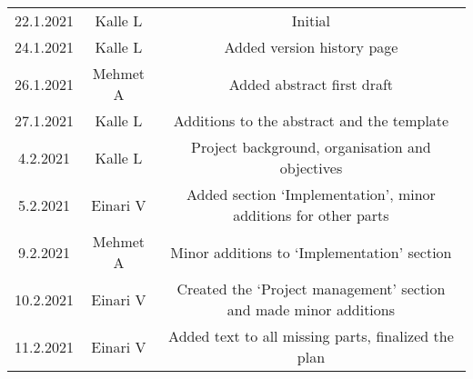 \begin{center}
	\begin{tabular}{ c c c }
		22.1.2021 & Kalle L & Initial \\ 
		24.1.2021 & Kalle L & Added version history page \\
		26.1.2021 & Mehmet A & Added abstract first draft \\ 
		27.1.2021 & Kalle L & Additions to the abstract and the template \\
		4.2.2021 & Kalle L & Project background, organisation and objectives \\ 
		5.2.2021 & Einari V & Added section `Implementation', minor additions for other parts \\
		9.2.2021 & Mehmet A & Minor additions to `Implementation' section \\
		10.2.2021 & Einari V & Created the `Project management' section and made minor additions \\
		11.2.2021 & Einari V & Added text to all missing parts, finalized the plan
	\end{tabular}
\end{center}